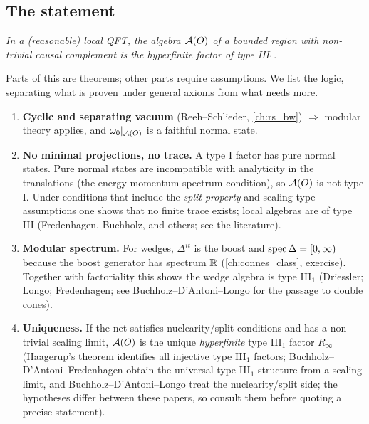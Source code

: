 \subsection{The statement}

\begin{center}
\emph{In a (reasonable) local QFT, the algebra $\mathcal{A}(O)$ of a bounded region with non-trivial causal complement is the hyperfinite factor of type III$_1$.}
\end{center}

Parts of this are theorems; other parts require assumptions. We list the logic, separating what is proven under general axioms from what needs more.

\begin{enumerate}
\item \textbf{Cyclic and separating vacuum} (Reeh--Schlieder, \cref{ch:rs_bw}) $\Rightarrow$ modular theory applies, and $\omega_0|_{\mathcal{A}(O)}$ is a faithful normal state.
\item \textbf{No minimal projections, no trace.} A type I factor has pure normal states. Pure normal states are incompatible with analyticity in the translations (the energy-momentum spectrum condition), so $\mathcal{A}(O)$ is not type I. Under conditions that include the \emph{split property} and scaling-type assumptions one shows that no finite trace exists; local algebras are of type III (Fredenhagen, Buchholz, and others; see the literature).
\item \textbf{Modular spectrum.} For wedges, $\Delta^{it}$ is the boost and $\operatorname{spec}\Delta=[0,\infty)$ because the boost generator has spectrum $\mathbb{R}$ (\cref{ch:connes_class}, exercise). Together with factoriality this shows the wedge algebra is type III$_1$ (Driessler; Longo; Fredenhagen; see Buchholz--D'Antoni--Longo for the passage to double cones).
\item \textbf{Uniqueness.} If the net satisfies nuclearity/split conditions and has a non-trivial scaling limit, $\mathcal{A}(O)$ is the unique \emph{hyperfinite} type III$_1$ factor $R_\infty$ (Haagerup's theorem \cite{Haagerup1987} identifies all injective type III$_1$ factors; Buchholz--D'Antoni--Fredenhagen \cite{BDF1987} obtain the universal type III$_1$ structure from a scaling limit, and Buchholz--D'Antoni--Longo \cite{BuchholzDAntoniLongo1990} treat the nuclearity/split side; the hypotheses differ between these papers, so consult them before quoting a precise statement).
\end{enumerate}

